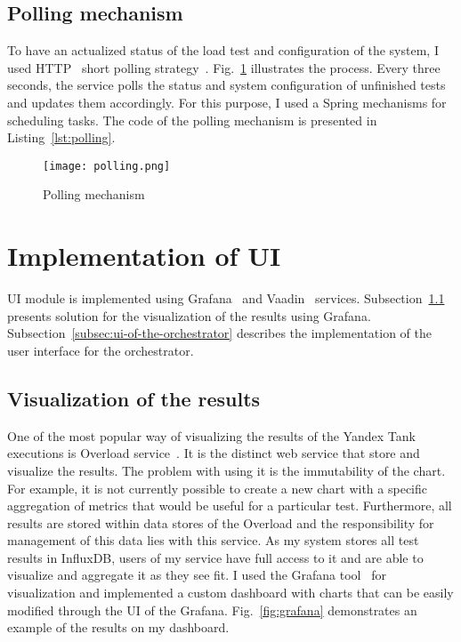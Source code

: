 \subsection{Polling mechanism}\label{subsec:polling_mechanism}
To have an actualized status of the load test and configuration of the system, I used HTTP~\cite{http} short polling strategy~\cite{http_polling}.
Fig.~\ref{fig:polling} illustrates the process. Every three seconds, the service polls the status and system configuration of unfinished tests and updates them accordingly.
For this purpose, I used a Spring mechanisms for scheduling tasks. The code of the polling mechanism is presented in Listing~\ref{lst:polling}.
\begin{figure}[t]
    \centering
    \texttt{[image: polling.png]}
    \caption{Polling mechanism}
    \label{fig:polling}
\end{figure}

\begin{minipage}{\textwidth}
    
\end{minipage}


\section{Implementation of UI}\label{sec:implementation-of-ui}
UI module is implemented using Grafana~\cite{grafana} and Vaadin~\cite{vaadin} services.
Subsection~\ref{subsec:visualization-of-the-results} presents solution for the visualization of the results using Grafana.
Subsection~\ref{subsec:ui-of-the-orchestrator} describes the implementation of the user interface for the orchestrator.

\subsection{Visualization of the results}\label{subsec:visualization-of-the-results}
One of the most popular way of visualizing the results of the Yandex Tank executions is Overload service~\cite{overload}. It is the distinct web service that store and visualize the results. The problem with using it is the immutability of the chart.
For example, it is not currently possible to create a new chart with a specific aggregation of metrics that would be useful for a particular test. Furthermore, all results are stored within data stores of the Overload and the responsibility for management of this data lies with this service.
As my system stores all test results in InfluxDB, users of my service have full access to it and are able to visualize and aggregate it as they see fit.
I used the Grafana tool~\cite{grafana} for visualization and implemented a custom dashboard with charts that can be easily modified through the UI of the Grafana. Fig.~\ref{fig:grafana} demonstrates an example of the results on my dashboard.

